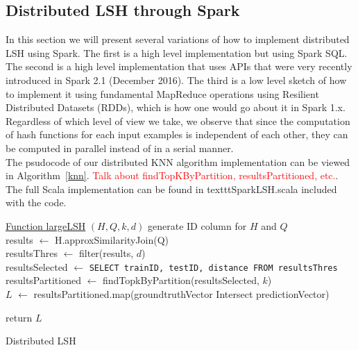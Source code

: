 \documentclass[letterpaper,twocolumn,10pt]{article}
\theoremstyle{definition}
\newcommand{\red}[1]{\textcolor{red}{#1}}
\begin{document}
\subsection{Distributed LSH through Spark}

In this section we will present several variations of how to implement distributed LSH using Spark. The 
first is a high level implementation but using Spark SQL. The second is a high level implementation that 
uses APIs that were very recently introduced in Spark 2.1 (December 2016). The 
third is a low level sketch of how to implement it using fundamental MapReduce operations using 
Resilient Distributed Datasets (RDDs), which is how one would go about it in Spark 1.x. \\

Regardless of which level of view we take, we observe that since the computation of hash functions for 
each input examples is independent of each other, they can be computed in parallel instead of in a 
serial manner. \\

The psudocode of our distributed KNN algorithm implementation can be viewed in Algorithm~\ref{knn}. 
\red{Talk about findTopKByPartition, resultsPartitioned, etc.}. The full Scala implementation can be 
found in texttt{SparkLSH.scala} included with the code. \\

\begin{algorithm}[h]
	\underline{Function largeLSH} $(H, Q, k, d)$\;
	generate ID column for $H$ and $Q$ \\
	results $\leftarrow$ H.approxSimilarityJoin(Q)   \\
	resultsThres $\leftarrow$ filter(results, $d$) \\
	resultsSelected $\leftarrow$ \texttt{SELECT trainID, testID, distance FROM resultsThres} \\
	resultsPartitioned $\leftarrow$  findTopkByPartition(resultsSelected, $k$) \\
	$L$ $\leftarrow$ resultsPartitioned.map(groundtruthVector Intersect predictionVector)
	
	return $L$\;

	\caption{Distributed LSH}
	\label{knn}
\end{algorithm}
\end{document}
